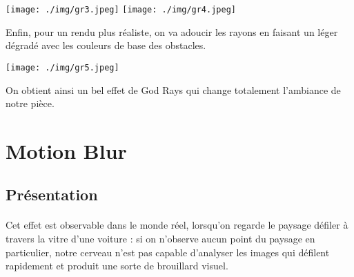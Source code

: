 \documentclass[a4paper]{article}
\begin{document}
\begin{center}
\texttt{[image: ./img/gr3.jpeg]}\hspace{0.2cm}
\texttt{[image: ./img/gr4.jpeg]}
\end{center}

Enfin, pour un rendu plus réaliste, on va adoucir les rayons en faisant un léger dégradé avec les couleurs de base des obstacles.

\begin{center}
\texttt{[image: ./img/gr5.jpeg]}
\end{center}

On obtient ainsi un bel effet de God Rays qui change totalement l'ambiance de notre pièce.

\iffalse
\begin{lstlisting}[frame=single]
uniform sampler2D UserMapSampler;
uniform vec2 lightPositionOnScreen;
void main()
/// Our light scattering pass sampler
uniform sampler2D UserMapSampler;
/// Our base render sampler
uniform sampler2D ColorMapSampler;
{
 float decay=0.96815;
 float exposure=0.2;
 float density=0.926;
 float weight=0.58767;
 /// NUM_SAMPLES will describe the rays quality, you can play with
 int NUM_SAMPLES = 100;
 vec2 tc = gl_TexCoord[0].xy;
 vec2 deltaTextCoor = tc - lightPositionOnScreen.xy;
 deltaTexCoord *= 1.0 / float(NUM_SAMPLES) * density;
 float illuminationDecay = 1.0;
 vec4 color =texture2D(UserMapSampler, tc.xy)*0.4;
 for(int i=0; i < NUM_SAMPLES ; i++)
 {
    tc -= deltaTexCoord;
    vec4 sample = texture2D(UserMapSampler, tc)*0.4;
    sample *= illuminationDecay * weight;
    color += sample;
    illuminationDecay *= decay;
 }
 vec4 realColor = texture2D(ColorMapSampler, gl_TexCoord[0].xy);
 gl_FragColor = ((vec4((vec3(color.r, color.g, color.b) * exposure), 1)) + (realColor*(1.1)))
}
\end{lstlisting}
\fi

\section{Motion Blur}
\subsection{Présentation}
\paragraph{} Cet effet est observable dans le monde réel, lorsqu'on regarde le paysage défiler à travers la vitre d'une voiture : si on n'observe aucun point du paysage en particulier, notre cerveau n'est pas capable d'analyser les images qui défilent rapidement et produit une sorte de brouillard visuel.
\end{document}
